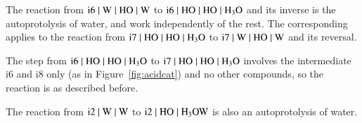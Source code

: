 
The reaction from $\mathrm{i6 \; \vert \; W \; \vert \; HO \; \vert \; W}$ to 
$\mathrm{i6 \; \vert \; HO \; \vert \; HO \; \vert \; H_3O}$ and its inverse is 
the autoprotolysis of water, and work independently of the rest.
The corresponding applies to the reaction from $\mathrm{i7 \; \vert \; HO \; \vert \; HO \; \vert \; H_3O}$ 
to $\mathrm{i7 \; \vert \; W \; \vert \; HO \; \vert \; W}$ and its reversal.

The step from $\mathrm{i6 \; \vert \; HO \; \vert \; HO \; \vert \; H_3O}$ to 
$\mathrm{i7 \; \vert \; HO \; \vert \; HO \; \vert \; H_3O}$ 
involves the intermediate i6 and i8 only (as in Figure~\ref{fig:acidcat}) and no other compounds, 
so the reaction is as described before.

The reaction from $\mathrm{i2 \; \vert \; W \; \vert \; W}$ to $\mathrm{i2 \; \vert \; HO \; \vert \; H_3OW}$ 
is also an autoprotolysis of water. 

